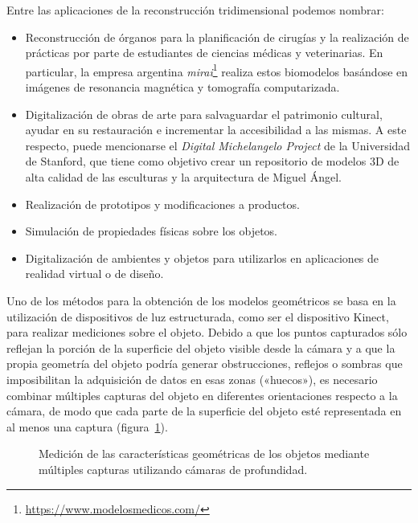 	Entre las aplicaciones de la reconstrucción tridimensional podemos nombrar:
	\begin{itemize}
		\item Reconstrucción de órganos para la planificación de cirugías
			y la realización de prácticas por parte de estudiantes de ciencias médicas y veterinarias.
			En particular, la empresa argentina \emph{mirai}\footnote{\url{https://www.modelosmedicos.com/}} realiza estos biomodelos basándose en imágenes de resonancia magnética y tomografía computarizada.
		\item Digitalización de obras de arte para salvaguardar el patrimonio cultural,
			ayudar en su restauración e incrementar la accesibilidad a las mismas.
			A este respecto, puede mencionarse el \emph{Digital Michelangelo Project} de la Universidad de Stanford, que tiene como objetivo crear un repositorio de modelos 3D de alta calidad de las esculturas y la arquitectura de Miguel Ángel.
		\item Realización de prototipos y modificaciones a productos.
		\item Simulación de propiedades físicas sobre los objetos.
		\item Digitalización de ambientes y objetos para utilizarlos en aplicaciones de realidad virtual o de diseño.
	\end{itemize}

	Uno de los métodos para la obtención de los modelos geométricos
	se basa en la utilización de dispositivos de luz estructurada,
	como ser el dispositivo Kinect\cite{MatheEstudioKinect},
	para realizar mediciones sobre el objeto.
	Debido a que los puntos capturados sólo reflejan la porción de la superficie del objeto visible desde la cámara
	y a que la propia geometría del objeto podría generar obstrucciones, reflejos o sombras
	que imposibilitan la adquisición de datos en esas zonas («huecos»),
	es necesario combinar múltiples capturas
	del objeto en diferentes orientaciones respecto a la cámara, de modo que
	cada parte de la superficie del objeto esté representada en al menos una captura (figura~\ref{fig:kinect_reconstruction}).

	\begin{figure}
		\caption{\label{fig:kinect_reconstruction}Medición de las características geométricas de los objetos mediante múltiples capturas utilizando cámaras de profundidad.}
	\end{figure}

